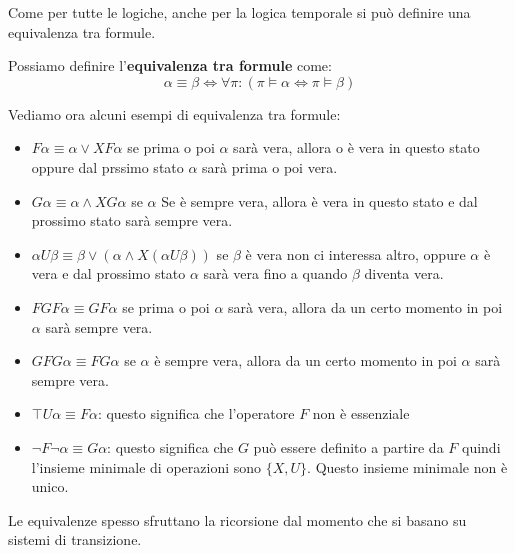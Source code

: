 Come per tutte le logiche, anche per la logica temporale si può definire una
equivalenza tra formule.
\begin{definizione}
    Possiamo definire l'\textbf{equivalenza tra formule} come:
    \begin{equation}
        \alpha \equiv \beta \iff \forall \pi : ( \pi \vDash \alpha \iff \pi \vDash \beta)
    \end{equation}
\end{definizione}
\begin{esempio}
    Vediamo ora alcuni esempi di equivalenza tra formule:
    \begin{itemize}
        \item $F\alpha \equiv \alpha \lor XF\alpha$ se prima o poi $\alpha$ sarà
              vera, allora o è vera in questo stato oppure dal prssimo stato
              $\alpha$ sarà prima o poi vera.
        \item $G\alpha \equiv \alpha \land XG\alpha$ se $\alpha$ Se è sempre vera,
              allora è vera in questo stato e dal prossimo stato sarà sempre vera.
        \item $\alpha U \beta \equiv \beta \lor (\alpha \land X(\alpha U \beta))$
              se $\beta$ è vera non ci interessa altro, oppure $\alpha$ è vera e
              dal prossimo stato $\alpha$ sarà vera fino a quando $\beta$ diventa
              vera.
        \item $FGF \alpha \equiv GF\alpha$ se prima o poi $\alpha$ sarà vera, allora
              da un certo momento in poi $\alpha$ sarà sempre vera.
        \item $GFG\alpha \equiv FG\alpha$ se $\alpha$ è sempre vera, allora da un
              certo momento in poi $\alpha$ sarà sempre vera.
        \item $\top U\alpha \equiv F\alpha$: questo significa che l'operatore
              $F$ non è essenziale
        \item $\lnot F \lnot \alpha\equiv G\alpha$: questo significa che $G$ può
              essere definito a partire da $F$ quindi l'insieme minimale di
              operazioni sono $\{X,U\}$. Questo insieme minimale non è unico.
    \end{itemize}
\end{esempio}
Le equivalenze spesso sfruttano la ricorsione dal momento che si basano su sistemi
di transizione.

